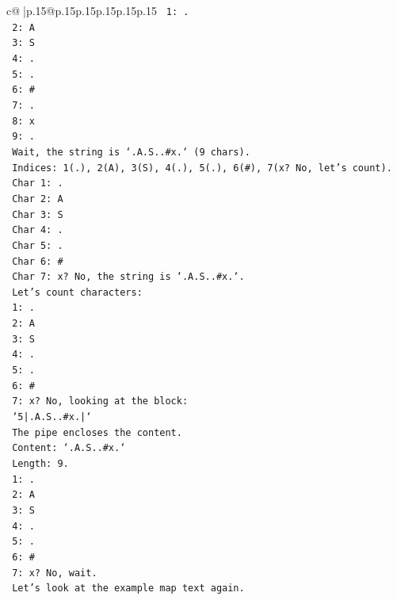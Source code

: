 \documentclass{article}
\begin{document}
{\begin{supertabular}{c@{$\;$}|p{.15\linewidth}@{}p{.15\linewidth}p{.15\linewidth}p{.15\linewidth}p{.15\linewidth}p{.15\linewidth}}
{{{\texttt{   1: .} \\
\texttt{   2: A} \\
\texttt{   3: S} \\
\texttt{   4: .} \\
\texttt{   5: .} \\
\texttt{   6: \#} \\
\texttt{   7: .} \\
\texttt{   8: x} \\
\texttt{   9: .} \\
\texttt{   Wait, the string is `.A.S..\#x.` (9 chars).} \\
\texttt{   Indices: 1(.), 2(A), 3(S), 4(.), 5(.), 6(\#), 7(x? No, let's count).} \\
\texttt{   Char 1: .} \\
\texttt{   Char 2: A} \\
\texttt{   Char 3: S} \\
\texttt{   Char 4: .} \\
\texttt{   Char 5: .} \\
\texttt{   Char 6: \#} \\
\texttt{   Char 7: x? No, the string is `.A.S..\#x.`.} \\
\texttt{   Let's count characters:} \\
\texttt{   1: .} \\
\texttt{   2: A} \\
\texttt{   3: S} \\
\texttt{   4: .} \\
\texttt{   5: .} \\
\texttt{   6: \#} \\
\texttt{   7: x? No, looking at the block:} \\
\texttt{   `5|.A.S..\#x.|`} \\
\texttt{   The pipe encloses the content.} \\
\texttt{   Content: `.A.S..\#x.`} \\
\texttt{   Length: 9.} \\
\texttt{   1: .} \\
\texttt{   2: A} \\
\texttt{   3: S} \\
\texttt{   4: .} \\
\texttt{   5: .} \\
\texttt{   6: \#} \\
\texttt{   7: x? No, wait.} \\
\texttt{   Let's look at the example map text again.} \\
}}}
\end{supertabular}}
\end{document}

